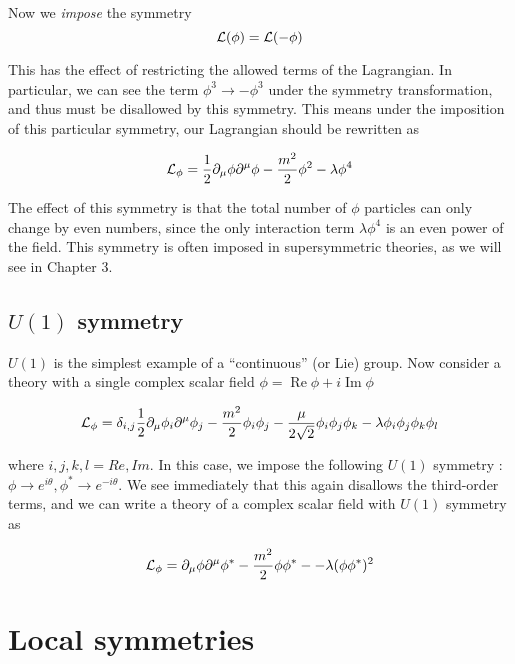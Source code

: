 Now we \textit{impose} the symmetry
\begin{equation}
\mathcal{L}(\phi) = \mathcal{L}(- \phi)
\end{equation}

This has the effect of restricting the allowed terms of the Lagrangian.
In particular, we can see the term $\phi^3 \rightarrow - \phi^3$ under the symmetry transformation, and thus must be disallowed by this symmetry.
This means under the imposition of this particular symmetry, our Lagrangian should be rewritten as

\begin{equation}
\mathcal{L}_\phi = \frac{1}{2} \partial_\mu \phi \partial^\mu \phi - \frac{m^2}{2} \phi^2  - \lambda \phi^4
\end{equation}

The effect of this symmetry is that the total number of  $\phi$ particles can only change by even numbers, since the only interaction term $\lambda \phi^4$ is an even power of the field.
This symmetry is often imposed in supersymmetric theories, as we will see in Chapter 3.

\subsection{$U(1)$ symmetry}

$U(1)$ is the simplest example of a ``continuous'' (or Lie) group.
Now consider a theory with a single complex scalar field $\phi = \operatorname{Re}\phi + i \operatorname{Im}\phi$

\begin{equation}
\mathcal{L}_\phi = \delta_{i,j} \frac{1}{2} \partial_\mu \phi_i \partial^\mu \phi_j - \frac{m^2}{2} \phi_i \phi_j - \frac{\mu}{2 \sqrt{2}}  \phi_i \phi_j \phi_k  - \lambda \phi_i \phi_j \phi_k \phi_l
\end{equation}

where $i,j,k,l = Re, Im$.
In this case, we impose the following $U(1)$ symmetry : $\phi \rightarrow e^{i\theta}, \phi^* \rightarrow e^{-i\theta} $.
We see immediately that this again disallows the third-order terms, and we can write a theory of a complex scalar field with $U(1)$ symmetry as

\begin{equation}
\mathcal{L}_\phi =  \partial_\mu \phi \partial^\mu \phi^* - \frac{m^2}{2} \phi \phi^* -   - \lambda (\phi \phi^*)^2
\end{equation}

\section{Local symmetries}

